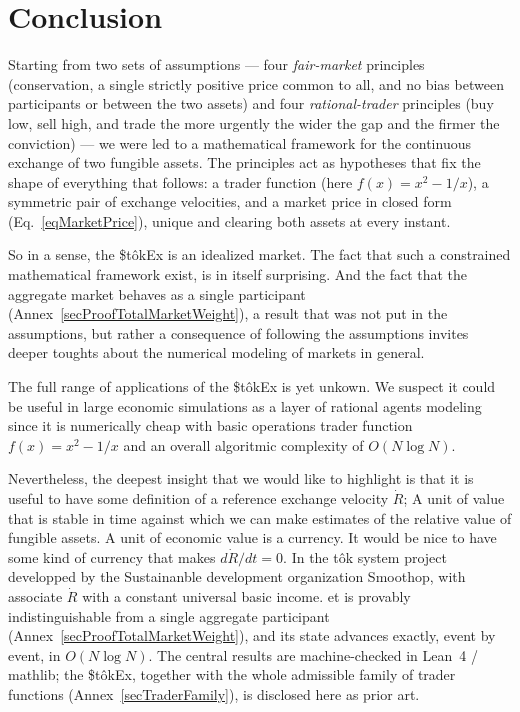 \documentclass[letterpaper]{article}
\newcommand{\StokEx}{\$t\^{o}kEx}
\begin{document}
\section{Conclusion}

Starting from two sets of assumptions --- four \emph{fair-market} principles (conservation, a single strictly positive price common to all,
and no bias between participants or between the two assets) and four \emph{rational-trader} principles
(buy low, sell high, and trade the more urgently the wider the gap and the firmer the conviction) ---
we were led to a mathematical framework for the continuous exchange of two fungible assets.
The principles act as hypotheses that fix the shape of everything that follows: a trader function (here $f(x) = x^2 - 1/x$),
a symmetric pair of exchange velocities, and a market price in closed form (Eq.~\eqref{eqMarketPrice}),
unique and clearing both assets at every instant.

So in a sense, the \StokEx{} is an idealized market. The fact that such a constrained mathematical framework exist, is in itself surprising.
And the fact that the aggregate market behaves as a single participant (Annex~\ref{secProofTotalMarketWeight}), a result that was not put in the assumptions, but rather a consequence of following the assumptions invites deeper toughts about the numerical modeling of markets in general.

The full range of applications of the \StokEx{} is yet unkown.
We suspect it could be useful in large economic simulations as a layer of rational agents modeling since it is numerically cheap with basic operations trader function $f(x) = x^2 - 1/x$ and an overall algoritmic complexity of $O(N \log N)$.

Nevertheless, the deepest insight that we would like to highlight is that it is useful to have some definition of a reference exchange velocity $\dot{R}$; A unit of value that is stable in time against which we can make estimates of the relative value of fungible assets.
A unit of economic value is a currency. It would be nice to have some kind of currency that makes $d\dot{R}/dt = 0$. In the tôk system project developped by the Sustainanble development organization Smoothop, with associate $\dot{R}$ with a constant universal basic income.
et is provably indistinguishable from a single aggregate participant (Annex~\ref{secProofTotalMarketWeight}), and its state advances exactly, event by event, in $O(N \log N)$. The central results are machine-checked in Lean~4 / mathlib; the \StokEx{}, together with the whole admissible family of trader functions (Annex~\ref{secTraderFamily}), is disclosed here as prior art.
\end{document}

